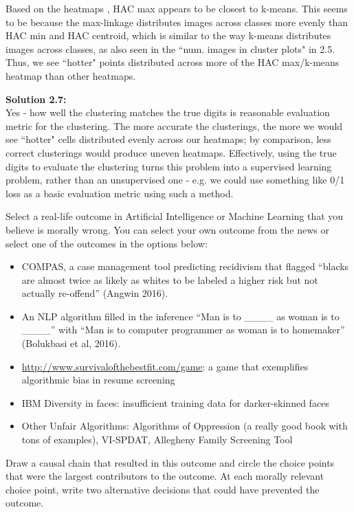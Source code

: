 \documentclass[submit]{harvardml}
\begin{document}
Based on the heatmaps , HAC max appears to be closest  to k-means. This seems to be because the max-linkage distributes images across classes more evenly than HAC min and HAC centroid, which is similar to the way k-means distributes images across classes, as also seen in the ``num. images in cluster plots" in 2.5. Thus, we see ``hotter" points distributed across more of the HAC max/k-means heatmap than other heatmaps.
\newpage

\noindent\textbf{Solution 2.7:}\\
Yes - how well the clustering matches the true digits is reasonable evaluation metric for the clustering. The more accurate the clusterings, the more we would see ``hotter" cells distributed evenly across our heatmaps; by comparison, less correct clusterings would produce uneven heatmaps. Effectively, using the true digits to evaluate the clustering turns this problem into a supervised learning problem, rather than an unsupervised one - e.g. we could use something like 0/1 loss as a basic evaluation metric using such a method.

\newpage

\begin{problem}

Select a real-life outcome in Artificial Intelligence or Machine Learning 
that you believe is morally wrong. You can select your own outcome from 
the news or select one of the outcomes in the options below:

\begin{itemize}
    \item COMPAS, a case management tool predicting recidivism that 
        flagged “blacks are almost twice as likely as whites to be 
        labeled a higher risk but not actually re-offend” (Angwin 
        2016).
        
    \item An NLP algorithm filled in the inference “Man is to 
        \_\_\_\_ as woman is to \_\_\_\_” with “Man is 
        to computer programmer as woman is to homemaker” (Bolukbasi 
        et al, 2016).
        
    \item \url{http://www.survivalofthebestfit.com/game}: a game that 
        exemplifies algorithmic bias in resume screening
        
    \item IBM Diversity in faces: insufficient training data for 
        darker-skinned faces
        
    \item Other Unfair Algorithms: Algorithms of Oppression (a really 
        good book with tons of examples), VI-SPDAT, Allegheny Family 
        Screening Tool
        
\end{itemize}
Draw a causal chain that resulted in this outcome and circle the choice points that were the largest contributors to the outcome. At each morally relevant choice point, write two alternative decisions that could have prevented the outcome.

\end{problem}
\end{document}
